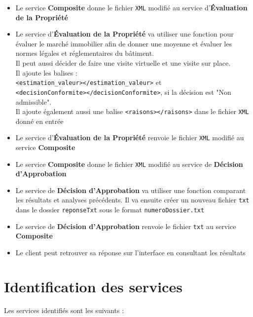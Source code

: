 \documentclass{article}
\begin{document}
\begin{itemize}
	  	\item Le service \textbf{Composite} donne le fichier \texttt{XML} modifié au service d'\textbf{Évaluation de la Propriété}
	  	
	  	\item Le service d'\textbf{Évaluation de la Propriété} va utiliser une fonction pour évaluer le marché immobilier afin de donner une moyenne et évaluer les normes légales et réglementaires du bâtiment. \\
	  	Il peut aussi décider de faire une visite virtuelle et une visite sur place. \\
	  	Il ajoute les balises : \\
	  	\texttt{<estimation\_valeur></estimation\_valeur>} et \\
	  	 \texttt{<decisionConformite></decisionConformite>}, si la décision est "Non admissible". \\
	  	Il ajoute également aussi une balise \texttt{<raisons></raisons>} dans le fichier \texttt{XML} donné en entrée
	  	
	  	\item Le service d'\textbf{Évaluation de la Propriété} renvoie le fichier \texttt{XML} modifié au service \textbf{Composite}
	  	
	  	\item Le service \textbf{Composite} donne le fichier \texttt{XML} modifié au service de \textbf{Décision d'Approbation}
	  	
	  	\item Le service de \textbf{Décision d’Approbation} va utiliser une fonction comparant les résultats et analyses précédents. Il va ensuite créer un nouveau fichier \texttt{txt} dans le dossier \texttt{reponseTxt} sous le format \texttt{numeroDossier.txt}
	  	
	  	\item Le service de \textbf{Décision d’Approbation} renvoie le fichier \texttt{txt} au service \textbf{Composite}
	  	
	  	\item Le client peut retrouver sa réponse sur l’interface en consultant les résultats
	  	
	  \end{itemize}
	
	\newpage
	\section{Identification des services}
		Les services identifiés sont les suivants : \\
		
\end{document}
